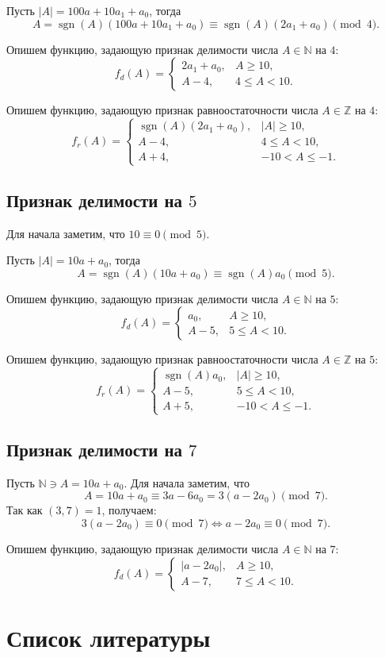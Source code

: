\documentclass[14pt, a4paper]{extarticle}
\theoremstyle{definition}
\DeclareMathOperator{\sgn}{sgn}
\begin{document}
	Пусть $|A|=100a+10a_1+a_0$, тогда
	$$A=\sgn(A)(100a+10a_1+a_0)\equiv\sgn(A)(2a_1+a_0)\pmod4.$$

	Опишем функцию, задающую признак делимости числа $A\in\mathbb{N}$ на $4$:
	$$f_d(A)=\begin{cases}
		2a_1+a_0,&A\geqslant10,\\
		A-4,&4\leqslant A<10.
	\end{cases}$$

	Опишем функцию, задающую признак равноостаточности числа $A\in\mathbb{Z}$ на $4$:
	$$f_r(A)=\begin{cases}
		\sgn(A)(2a_1+a_0),&|A|\geqslant10,\\
		A-4,&4\leqslant A<10,\\
		A+4,&-10<A\leqslant-1.
	\end{cases}$$

\subsection{Признак делимости на $5$}

	Для начала заметим, что $10\equiv0\pmod5$.
	
	Пусть $|A|=10a+a_0$, тогда
	$$A=\sgn(A)(10a+a_0)\equiv\sgn(A)a_0\pmod5.$$
	
	Опишем функцию, задающую признак делимости числа $A\in\mathbb{N}$ на $5$:
	$$f_d(A)=\begin{cases}
		a_0,&A\geqslant10,\\
		A-5,&5\leqslant A<10.
	\end{cases}$$
	
	Опишем функцию, задающую признак равноостаточности числа $A\in\mathbb{Z}$ на $5$:
	$$f_r(A)=\begin{cases}
		\sgn(A)a_0,&|A|\geqslant10,\\
		A-5,&5\leqslant A<10,\\
		A+5,&-10<A\leqslant-1.
	\end{cases}$$

\subsection{Признак делимости на $7$}

	Пусть $\mathbb{N}\ni A=10a+a_0$. Для начала заметим, что
	$$A=10a+a_0\equiv3a-6a_0=3(a-2a_0)\pmod7.$$
	Так как $(3,7)=1$, получаем:
	$$\boxed{3(a-2a_0)\equiv0\pmod7\Leftrightarrow a-2a_0\equiv0\pmod7}.$$

	Опишем функцию, задающую признак делимости числа $A\in\mathbb{N}$ на $7$:
	$$f_d(A)=\begin{cases}
		|a-2a_0|,&A\geqslant10,\\
		A-7,&7\leqslant A<10.
	\end{cases}$$

\newpage
\section{Список литературы}
\end{document}
